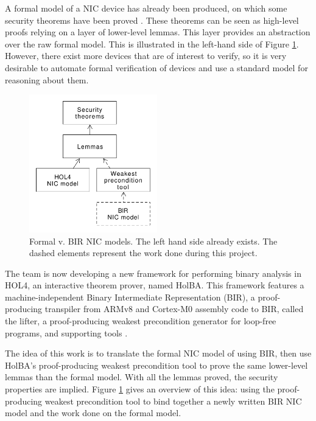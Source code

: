 \documentclass[10pt,a4paper]{article}
\begin{document}
\begin{multicols}{2}
A formal model of a {NIC} device has already been produced, on which some security theorems have been proved \cite{haglund_formal_2016,haglund_trustworthy_nodate}. These theorems can be seen as high-level proofs relying on a layer of lower-level lemmas. This layer provides an abstraction over the raw formal model. This is illustrated in the left-hand side of Figure \ref{hol-v-bir-nic-model-simple}. However, there exist more devices that are of interest to verify, so it is very desirable to automate formal verification of devices and use a standard model for reasoning about them.
%
\begin{figure}[H]
  \centering
	\includegraphics[height=6cm]{figures/hol-v-bir-nic-model-simple.png}
	\caption{Formal v. BIR NIC models. The left hand side already exists. The dashed elements represent the work done during this project.}
	\label{hol-v-bir-nic-model-simple}
\end{figure}

The team is now developing a new framework for performing binary analysis in HOL4, an interactive theorem prover, named {HolBA}. This framework features a machine-independent Binary Intermediate Representation (BIR), a proof-producing transpiler from ARMv8 and Cortex-M0 assembly code to BIR, called the lifter, a proof-producing weakest precondition generator for loop-free programs, and supporting tools \cite{metere_sound_2017,lindner_trabin:_2019}.

The idea of this work is to translate the formal {NIC} model of \cite{haglund_formal_2016} using {BIR}, then use HolBA's proof-producing weakest precondition tool to prove the same lower-level lemmas than the formal model. With all the lemmas proved, the security properties are implied. Figure \ref{hol-v-bir-nic-model-simple} gives an overview of this idea: using the proof-producing weakest precondition tool to bind together a newly written BIR NIC model and the work done on the formal model.


\end{multicols}
\end{document}

